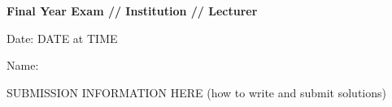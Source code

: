 \documentclass[a4paper]{article}
\begin{document}
\thispagestyle{empty}

\textbf{Final Year Exam // Institution // Lecturer}

\vspace{1cm}

Date: DATE at TIME

Name:

\vspace{1cm}

SUBMISSION INFORMATION HERE (how to write and submit solutions)

\vspace{1cm}

\begin{Verbatim}[breaklines=true]
%TOC%
\end{Verbatim}
\end{document}

